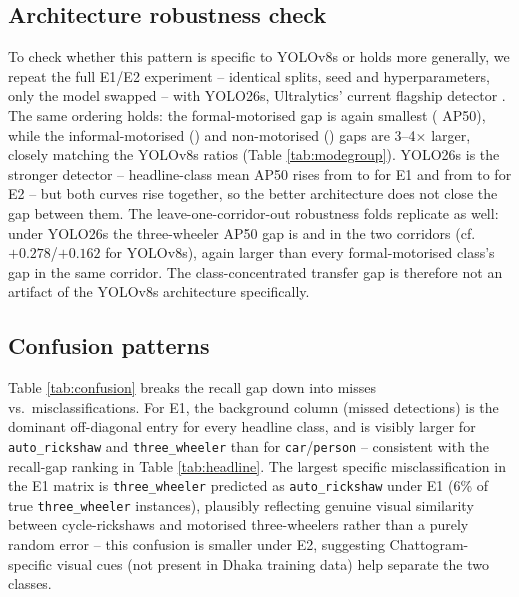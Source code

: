 \documentclass[conference,a4paper]{IEEEtran}
\begin{document}
\subsection{Architecture robustness check}
To check whether this pattern is specific to YOLOv8s or holds more generally, we
repeat the full E1/E2 experiment -- identical splits, seed and hyperparameters, only
the model swapped -- with YOLO26s, Ultralytics' current flagship detector
\cite{jocher2026yolo26}. The same
ordering holds: the formal-motorised gap is again smallest
(\GapFormalMotorisedAltArch{} AP50), while the informal-motorised
(\GapInformalMotorisedAltArch{}) and non-motorised (\GapNonMotorisedAltArch{}) gaps are
3--4$\times$ larger, closely matching the YOLOv8s ratios (Table \ref{tab:modegroup}).
YOLO26s is the stronger detector -- headline-class mean AP50 rises from
\HeadlineMeanEOne{} to \HeadlineMeanEOneAltArch{} for E1 and from \HeadlineMeanETwo{}
to \HeadlineMeanETwoAltArch{} for E2 -- but both curves rise together, so the better
architecture does not close the gap between them. The leave-one-corridor-out robustness folds replicate as well: under YOLO26s the
three-wheeler AP50 gap is \RobAGapAltArch{} and \RobBGapAltArch{} in the two corridors
(cf.\ $+0.278$/$+0.162$ for YOLOv8s), again larger than every formal-motorised class's
gap in the same corridor. The class-concentrated transfer gap is therefore not an
artifact of the YOLOv8s architecture specifically.

\subsection{Confusion patterns}


Table \ref{tab:confusion} breaks the recall gap down into misses vs.\ misclassifications.
For E1, the background column (missed detections) is the dominant off-diagonal entry
for every headline class, and is visibly larger for \texttt{auto\_rickshaw} and
\texttt{three\_wheeler} than for \texttt{car}/\texttt{person} -- consistent with the
recall-gap ranking in Table \ref{tab:headline}. The largest specific
misclassification in the E1 matrix is \texttt{three\_wheeler} predicted as
\texttt{auto\_rickshaw} under E1 (6\% of true \texttt{three\_wheeler} instances),
plausibly reflecting genuine visual similarity between cycle-rickshaws and motorised
three-wheelers rather than a purely random error -- this confusion is smaller under
E2, suggesting Chattogram-specific visual cues (not present in Dhaka training data)
help separate the two classes.
\end{document}
